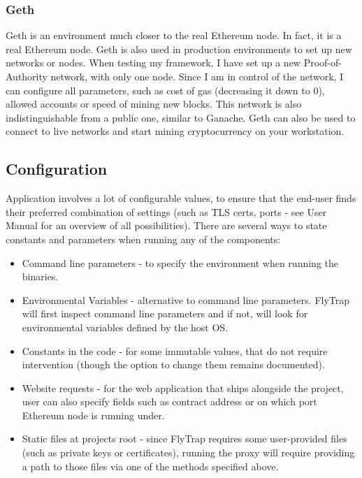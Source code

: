 \subsubsection{Geth}
Geth is an environment much closer to the real Ethereum node. In fact, it is a real Ethereum node. Geth is also used in production environments to set up new networks or nodes. When testing my framework, I have set up a new Proof-of-Authority network, with only one node. Since I am in control of the network, I can configure all parameters, such as cost of gas (decreasing it down to 0), allowed accounts or speed of mining new blocks. This network is also indistinguishable from a public one, similar to Ganache. Geth can also be used to connect to live networks and start mining cryptocurrency on your workstation.

\subsection{Configuration}
Application involves a lot of configurable values, to ensure that the end-user finds their preferred combination of settings (such as TLS certs, ports - see User Manual for an overview of all possibilities). There are several ways to state constants and parameters when running any of the components:
\begin{itemize}
    \item Command line parameters - to specify the environment when running the binaries.
    \item Environmental Variables - alternative to command line parameters. FlyTrap will first inspect command line parameters and if not, will look for environmental variables defined by the host OS.
    \item Constants in the code - for some immutable values, that do not require intervention (though the option to change them remains documented).
    \item Website requests - for the web application that ships alongside the project, user can also specify fields such as contract address or on which port Ethereum node is running under.
    \item Static files at projects root - since FlyTrap requires some user-provided files (such as private keys or certificates), running the proxy will require providing a path to those files via one of the methods specified above.
\end{itemize}
